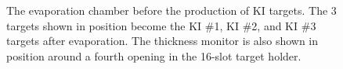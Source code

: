 \begin{figure}[!p]
\centering
{}
\caption{\label{fig:KI_Evap}The evaporation chamber before the production of KI targets. The 3 targets shown in position become the KI $\#$1, KI $\#$2, and KI $\#$3 targets after evaporation. The thickness monitor is also shown in position around a fourth opening in the 16-slot target holder.}
\end{figure}

